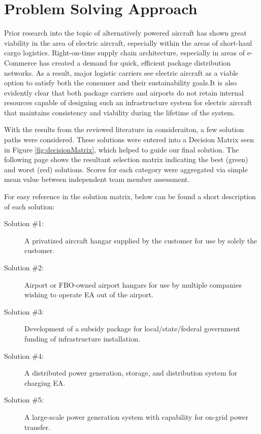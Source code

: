 \documentclass[../main.tex]{subfiles}
\begin{document}
\section{Problem Solving Approach}\label{finalDesign}
Prior research into the topic of alternatively powered aircraft has shown great viability in the area of electric aircraft, especially within the areas of short-haul cargo logistics. Right-on-time supply chain architecture, especially in areas of e-Commerce has created a demand for quick, efficient package distribution networks. As a result, major logistic carriers see electric aircraft as a viable option to satisfy both the consumer and their sustainability goals.It is also evidently clear that both package carriers and airports do not retain internal resources capable of designing such an infrastructure system for electric aircraft that maintains consistency and viability during the lifetime of the system.\par
With the results from the reviewed literature in consideraiton, a few solution paths were considered. These solutions were entered into a Decision Matrix seen in Figure \ref{fig:decisionMatrix}, which helped to guide our final solution. The following page shows the resultant selection matrix indicating the best (green) and worst (red) solutions. Scores for each category were aggregated via simple mean value between independent team member assessment.\par
For easy reference in the solution matrix, below can be found a short description of each solution:
\begin{singlespace}
\begin{description}
    \item[Solution \#1:] A privatized aircraft hangar supplied by the customer for use by solely the customer.
    \item[Solution \#2:] Airport or FBO-owned airport hangars for use by multiple companies wishing to operate EA out of the airport.
    \item[Solution \#3:] Development of a subsidy package for local/state/federal government funding of infrastructure installation.
    \item[Solution \#4:] A distributed power generation, storage, and distribution system for charging EA.
    \item[Solution \#5:] A large-scale power generation system with capability for on-grid power transfer.
\end{description}
\end{singlespace}
\end{document}
